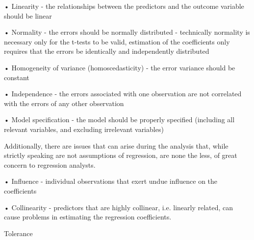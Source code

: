 •
Linearity - the relationships between the predictors and the outcome variable should be linear

•
Normality - the errors should be normally distributed - technically normality is necessary only for the t-tests to be valid, estimation of the coefficients only requires that the errors be identically and independently distributed

•
Homogeneity of variance (homoscedasticity) - the error variance should be constant

•
Independence - the errors associated with one observation are not correlated with the errors of any other observation

•
Model specification - the model should be properly specified (including all relevant variables, and excluding irrelevant variables)


 

Additionally, there are issues that can arise during the analysis that, while strictly speaking are not assumptions of regression, are none the less, of great concern to regression analysts.

 
•
Influence - individual observations that exert undue influence on the coefficients

•
Collinearity - predictors that are highly collinear, i.e. linearly related, can cause problems in estimating the regression coefficients.


 

Tolerance

 

